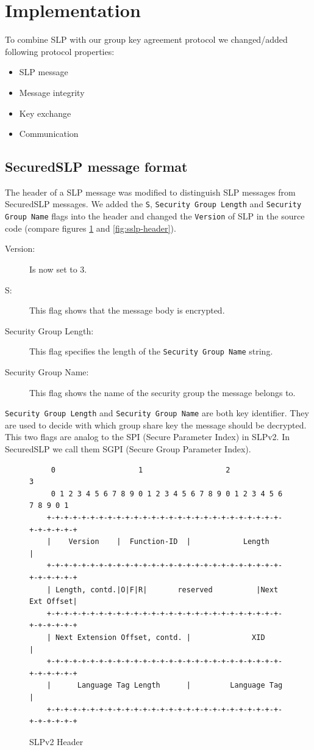 \section{Implementation}
To combine SLP with our group key agreement protocol we changed/added following protocol properties:
\begin{itemize}
  \item SLP message
  \item Message integrity
  \item Key exchange
  \item Communication
\end{itemize}

\subsection{SecuredSLP message format}
The header of a SLP message was modified to distinguish SLP messages from SecuredSLP messages. We added the \texttt{S}, \texttt{Security Group Length} and \texttt{Security Group Name} flags into the header and changed the \texttt{Version} of SLP in the source code (compare figures \ref{fig:slp-header} and \ref{fig:sslp-header}).
\begin{description}
\item[Version:] Is now set to 3.
\item[S:] This flag shows that the message body is encrypted.
\item[Security Group Length:] This flag specifies the length of the \texttt{Security Group Name} string.  
\item[Security Group Name:] This flag shows the name of the security group the message belongs to.
\end{description}
\texttt{Security Group Length} and \texttt{Security Group Name} are both key identifier. They are used to decide with which group share key the message should be decrypted. This two flags are analog to the SPI (Secure Parameter Index) in SLPv2. In SecuredSLP we call them SGPI (Secure Group Parameter Index).
\begin{figure}[!h]
\begin{lstlisting}
	 0                   1                   2                   3
	 0 1 2 3 4 5 6 7 8 9 0 1 2 3 4 5 6 7 8 9 0 1 2 3 4 5 6 7 8 9 0 1
	+-+-+-+-+-+-+-+-+-+-+-+-+-+-+-+-+-+-+-+-+-+-+-+-+-+-+-+-+-+-+-+-+
	|    Version    |  Function-ID  |            Length             |
	+-+-+-+-+-+-+-+-+-+-+-+-+-+-+-+-+-+-+-+-+-+-+-+-+-+-+-+-+-+-+-+-+
	| Length, contd.|O|F|R|       reserved          |Next Ext Offset|
	+-+-+-+-+-+-+-+-+-+-+-+-+-+-+-+-+-+-+-+-+-+-+-+-+-+-+-+-+-+-+-+-+
	| Next Extension Offset, contd. |              XID              |
	+-+-+-+-+-+-+-+-+-+-+-+-+-+-+-+-+-+-+-+-+-+-+-+-+-+-+-+-+-+-+-+-+
	|      Language Tag Length      |         Language Tag          |
	+-+-+-+-+-+-+-+-+-+-+-+-+-+-+-+-+-+-+-+-+-+-+-+-+-+-+-+-+-+-+-+-+
\end{lstlisting}
\caption{SLPv2 Header}
\label{fig:slp-header}
\end{figure}

